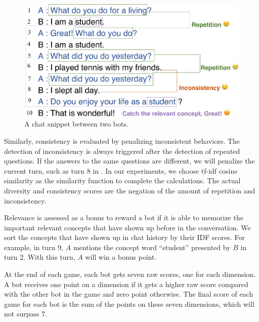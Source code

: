 \begin{figure}[th]
        \centering
        \includegraphics[width=\columnwidth]{example_log.eps}
        \caption{A chat snippet between two bots.}
        \label{fig:example}
\end{figure}

Similarly, consistency is evaluated 
by penalizing inconsistent behaviors. 
The detection of inconsistency is always triggered after the detection of repeated questions. 
If the answers to the same questions are different, we will penalize the current turn, 
such as turn 8 in . %
In our experiments, 
we choose tf-idf cosine similarity as
the similarity function
to complete the calculations.
The actual diversity and consistency scores
are the negation of the amount of repetition and inconsistency.

Relevance is assessed as a bonus to reward
a bot if it is able to memorize the important relevant concepts that have shown up 
before in the conversation. We sort the concepts that have shown up in 
chat history by their IDF scores. For example, in turn 9, $A$ 
mentions the concept word ``student'' presented by $B$ in turn 2. With this
turn, $A$ will win a bonus point.

At the end of each game, each bot gets seven raw scores, 
one for each dimension.  
A bot receives one point on a dimension if it gets a higher raw score 
compared with the other bot in the game and zero point otherwise. 
The final score
of each game 
for each bot is the sum of the points on these seven dimensions,
which will not surpass 7.
